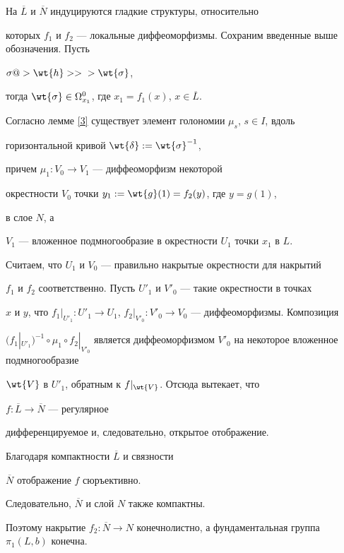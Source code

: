 \begin{pf}
На $\overline{L}$ и $\overline{N}$ индуцируются гладкие структуры, относительно


которых $f_1$ и $f_2$ --- локальные диффеоморфизмы. Сохраним введенные выше обозначения. Пусть


$\sigma @> {\wt{h}} >>{}>\wt{\sigma}$,


тогда $\wt{\sigma}\in\Omega^0_{x_1}$, где $x_1=f_1(x)$, $x\in\overline{L}$.


Согласно лемме \ref{3} существует элемент голономии $\mu_s$, $s\in I$, вдоль


горизонтальной кривой $\wt{\delta}:=\wt{\sigma}^{-1}$,


причем $\mu_1: V_0\to V_1$ --- диффеоморфизм некоторой


окрестности $V_0$ точки $y_1:=\wt{g}(1)=f_2(y)$, где $y=g(1)$,


в слое $N$, а


$V_1$ --- вложенное подмногообразие в окрестности $U_1$ точки $x_1$ в $L$.


Считаем, что $U_1$ и $V_0$ --- правильно накрытые окрестности для накрытий


$f_1$ и $f_2$ соответственно. Пусть $U'_1$ и $V'_0$ --- такие окрестности в точках


$x$ и $y$, что $f_1|_{U'_1}: U'_1\to U_1$, $f_2|_{V'_0}


: V'_0\to V_0$ --- диффеоморфизмы. Композиция


$(f_1|_{U'_1})^{-1}\circ\mu_1\circ


f_2|_{V'_0}$ является диффеоморфизмом $V'_0$ на некоторое вложенное подмногообразие


$\wt{V}$ в $U'_1$, обратным к $f|_{\wt{V}}$. Отсюда вытекает, что


$f:\overline{L}\to\overline{N}$ --- регулярное


дифференцируемое и, следовательно, открытое отображение.


Благодаря компактности $\overline{L}$ и связности


$\overline{N}$ отображение $f$ сюръективно.


Следовательно, $\overline{N}$ и слой $N$ также компактны.


Поэтому накрытие $f_2:\overline{N}\to


N$ конечнолистно, а фундаментальная группа $\pi_1(L,b)$  конечна.


\end{pf} 





